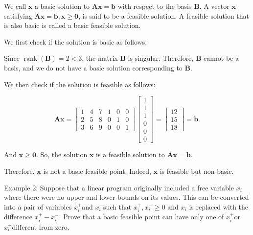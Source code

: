 We call \(\boldsymbol{x}\) a basic solution to \(\boldsymbol{A} \boldsymbol{x}=\boldsymbol{b}\) with respect to the basis \(\boldsymbol{B}\). A vector \(\boldsymbol{x}\) satisfying \(\boldsymbol{A} \boldsymbol{x}=\boldsymbol{b}, \boldsymbol{x} \geq \boldsymbol{0}\), is said to be a feasible solution. A feasible solution that is also basic is called a basic feasible solution.

We first check if the solution is basic as follows:

Since \(\operatorname{rank}(\boldsymbol{B})=2<3\), the matrix \(\boldsymbol{B}\) is singular. Therefore, \(\boldsymbol{B}\) cannot be a basis, and we do not have a basic solution corresponding to \(\boldsymbol{B}\).

We then check if the solution is feasible as follows:

\begin{equation*}
	\boldsymbol{A} \boldsymbol{x}=\left[\begin{array}{llllll}
		1 & 4 & 7 & 1 & 0 & 0 \\
		2 & 5 & 8 & 0 & 1 & 0 \\
		3 & 6 & 9 & 0 & 0 & 1
	\end{array}\right]\left[\begin{array}{l}
		1 \\
		1 \\
		1 \\
		0 \\
		0 \\
		0
	\end{array}\right]=\left[\begin{array}{l}
		12 \\
		15 \\
		18
	\end{array}\right]=\boldsymbol{b} .
\end{equation*}

And \(\boldsymbol{x} \geq \boldsymbol{0}\). So, the solution \(\boldsymbol{x}\) is a feasible solution to \(\boldsymbol{A} \boldsymbol{x}=\boldsymbol{b}\).

Therefore, \(\boldsymbol{x}\) is not a basic feasible point. Indeed, \(\boldsymbol{x}\) is feasible but non-basic.

\medskip
\noindent
Example 2: Suppose that a linear program originally included a free variable \(x_{i}\) where there were no upper and lower bounds on its values. This can be converted into a pair of variables \(x_{i}^{+}\)and \(x_{i}^{-}\)such that \(x_{i}^{+}, x_{i}^{-} \geq 0\) and \(x_{i}\) is replaced with the difference \(x_{i}^{+}-x_{i}^{-}\). Prove that a basic feasible point can have only one of \(x_{i}^{+}\)or \(x_{i}^{-}\)different from zero.

